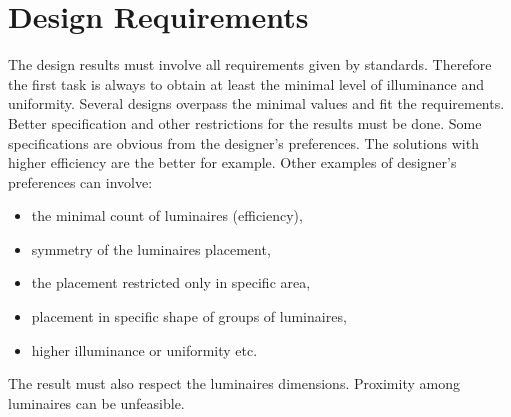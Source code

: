 \section{Design Requirements}
The design results must involve all requirements given by standards. Therefore the first task is always to obtain at least the minimal level of illuminance and uniformity. Several designs overpass the minimal values and fit the requirements. Better specification and other restrictions for the results must be done. Some specifications are obvious from the designer's preferences. The solutions with higher efficiency are the better for example. Other examples of designer's preferences can involve:

\begin{itemize}
	\item the minimal count of luminaires (efficiency),
	\item symmetry of the luminaires placement,
	\item the placement restricted only in specific area,
	\item placement in specific shape of groups of luminaires,
	\item higher illuminance or uniformity etc.
\end{itemize}

The result must also respect the luminaires dimensions. Proximity among luminaires can be unfeasible.